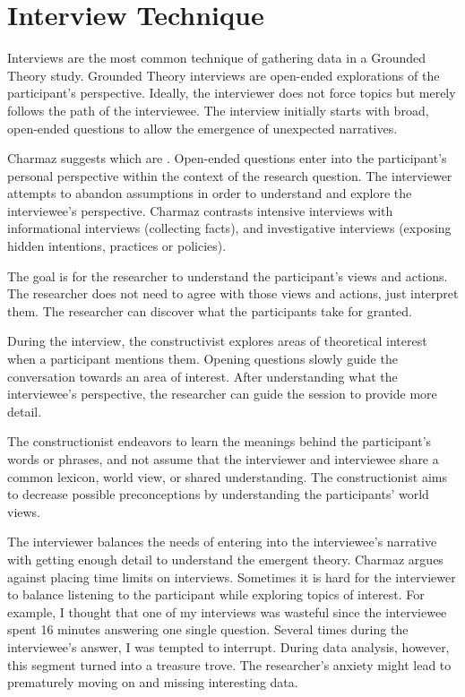 \section{Interview Technique}
Interviews are the most common technique of gathering data in a Grounded Theory study. Grounded Theory interviews are open-ended explorations of the participant’s perspective. Ideally, the interviewer does not force topics but merely follows the path of the interviewee. The interview initially starts with broad, open-ended questions to allow the emergence of unexpected narratives. 

Charmaz suggests  which are  \cite{Charmaz}. Open-ended questions enter into the participant's personal perspective within the context of the research question. The interviewer attempts to abandon assumptions in order to understand and explore the interviewee's perspective. Charmaz \cite{Charmaz} contrasts intensive interviews with informational interviews (collecting facts), and investigative interviews (exposing hidden intentions, practices or policies).

The goal is for the researcher to understand the participant's views and actions. The researcher does not need to agree with those views and actions, just interpret them. The researcher can discover what the participants take for granted.

During the interview, the constructivist explores areas of theoretical interest when a participant mentions them. Opening questions slowly guide the conversation towards an area of interest. After understanding what the interviewee's perspective, the researcher can guide the session to provide more detail.

The constructionist endeavors to learn the meanings behind the participant's words or phrases, and not assume that the interviewer and interviewee share a common lexicon, world view, or shared understanding. The constructionist aims to decrease possible preconceptions by understanding the participants' world views. 

The interviewer balances the needs of entering into the interviewee's narrative with getting enough detail to understand the emergent theory. Charmaz argues against placing time limits on interviews. Sometimes it is hard for the interviewer to balance listening to the participant while exploring topics of interest. For example, I thought that one of my interviews was wasteful since the interviewee spent 16 minutes answering one single question. Several times during the interviewee's answer, I was tempted to interrupt. During data analysis, however, this segment turned into a treasure trove. The researcher’s anxiety might lead to prematurely moving on and missing interesting data. 

